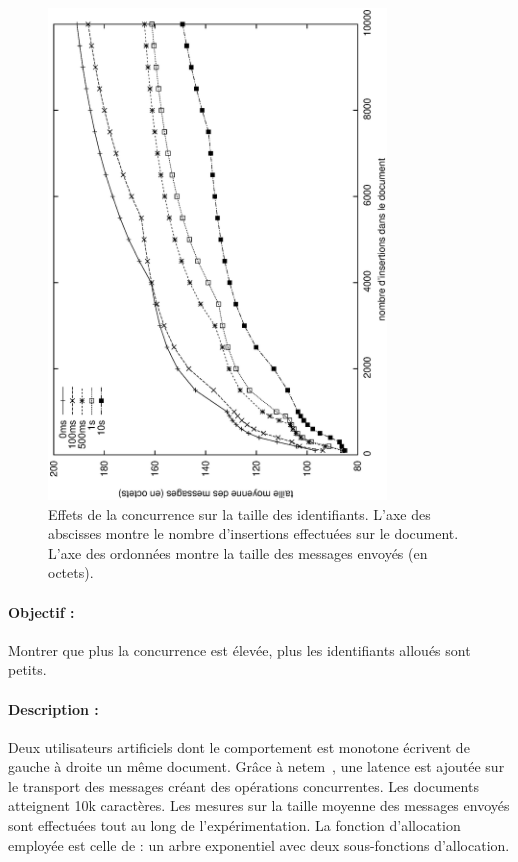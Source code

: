 \begin{figure}
  \begin{center}
    \includegraphics[angle=-90,width=0.8\textwidth]{img/lseq/latency.eps}
    \vspace{25pt}
    \caption[Effet de la concurrence sur les identifiants]
    {\label{repl:img:latency}Effets de la concurrence sur la taille des
      identifiants. L'axe des abscisses montre le nombre d'insertions effectuées
      sur le document. L'axe des ordonnées montre la taille des messages envoyés
      (en octets).}
  \end{center}
\end{figure}

\paragraph{Objectif :} Montrer que plus la concurrence est élevée, plus les
identifiants alloués sont petits.

\paragraph{Description :} Deux utilisateurs artificiels dont le comportement est
monotone écrivent de gauche à droite un même document. Grâce à
netem~\cite{netem}, une latence est ajoutée sur le transport des messages créant
des opérations concurrentes. Les documents atteignent 10k caractères. Les
mesures sur la taille moyenne des messages envoyés sont effectuées tout au long
de l'expérimentation. La fonction d'allocation employée est celle de \LSEQ : un
arbre exponentiel avec deux sous-fonctions d'allocation.


